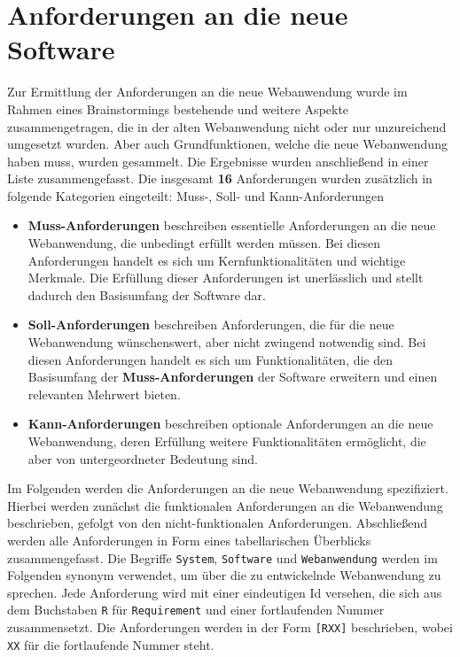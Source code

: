 
\chapter{Anforderungen an die neue Software}
\label{chapter:5}

Zur Ermittlung der Anforderungen an die neue Webanwendung wurde im Rahmen eines Brainstormings bestehende und weitere Aspekte zusammengetragen, die in der alten Webanwendung nicht oder nur unzureichend umgesetzt wurden.
Aber auch Grundfunktionen, welche die neue Webanwendung haben muss, wurden gesammelt.
Die Ergebnisse wurden anschließend in einer Liste zusammengefasst.
Die insgesamt \textbf{16} Anforderungen wurden zusätzlich in folgende Kategorien eingeteilt: Muss-, Soll- und Kann-Anforderungen

\begin{itemize}
    \item \textbf{Muss-Anforderungen} beschreiben essentielle Anforderungen an die neue Webanwendung, die unbedingt erfüllt werden müssen. Bei diesen Anforderungen handelt es sich um Kernfunktionalitäten und wichtige Merkmale. Die Erfüllung dieser Anforderungen ist unerlässlich und stellt dadurch den Basisumfang der Software dar.

    \item \textbf{Soll-Anforderungen} beschreiben Anforderungen, die für die neue Webanwendung wünschenswert, aber nicht zwingend notwendig sind. Bei diesen Anforderungen handelt es sich um Funktionalitäten, die den Basisumfang der \textbf{Muss-Anforderungen} der Software erweitern und einen relevanten Mehrwert bieten.

    \item \textbf{Kann-Anforderungen} beschreiben optionale Anforderungen an die neue Webanwendung, deren Erfüllung weitere Funktionalitäten ermöglicht, die aber von untergeordneter Bedeutung sind.
\end{itemize}

Im Folgenden werden die Anforderungen an die neue Webanwendung spezifiziert. Hierbei werden zunächst die funktionalen Anforderungen an die Webanwendung beschrieben, gefolgt von den nicht-funktionalen Anforderungen. Abschließend werden alle Anforderungen in Form eines tabellarischen Überblicks zusammengefasst. Die Begriffe \texttt{System}, \texttt{Software} und \texttt{Webanwendung} werden im Folgenden synonym verwendet, um über die zu entwickelnde Webanwendung zu sprechen. Jede Anforderung wird mit einer eindeutigen Id versehen, die sich aus dem Buchstaben \texttt{R} für \texttt{Requirement} und einer fortlaufenden Nummer zusammensetzt. Die Anforderungen werden in der Form \texttt{[RXX]} beschrieben, wobei \texttt{XX} für die fortlaufende Nummer steht.

